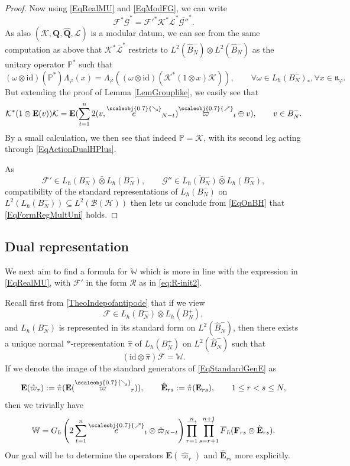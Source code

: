 \documentclass[11pt, reqno]{amsart}
\theoremstyle{definition}
\numberwithin{equation}{section}
\def\Fc{\mathcal F'}
\def\Rc{\mathcal R}
\newcommand{\Hsp}{\mathcal{H}}
\newcommand{\Bc}{\mathcal{B}}
\newcommand{\eb}{\mathbf{E}}
\newcommand{\Gauss}{G}
\newcommand{\Qb}{\mathbf{Q}}
\newcommand{\Kc}{\mathcal{K}}
\newcommand{\Fct}{\mathcal{F}}
\newcommand{\tFct}{\mathcal{G}}
\newcommand{\tFctt}{\mathcal{G}''}
\newcommand{\tKc}{\mathcal L}
\newcommand{\Bor}{B}
\newcommand{\nears}{\scaleobj{0.7}{\nearrow}}
\newcommand{\sears}{\scaleobj{0.7}{\searrow}}
\newcommand{\nee}{\overset{\nears}{e}}
\newcommand{\seee}{\overset{\sears}{e}}
\newcommand{\nevarpi}{\overset{\nears}{\varpi}}
\newcommand{\sevarpi}{\overset{\sears}{\varpi}}
\newcommand{\id}{\mathrm{id}}
\newcommand{\Eb}{\mathbf{E}}
\newcommand{\Wbb}{\mathbb{W}}
\newcommand{\mfn}{\mathfrak{n}}
\newcommand{\Lc}{\mathcal{L}}
\newcommand{\Pbb}{\mathbb{P}}
\def\stgE{\mathbf{E}}
\def\stgF{\mathbf{F}}
\begin{document}
\begin{proof}
Now using \eqref{EqRealMU} and \eqref{EqModFG}, we can write 
\[
\Fct^* \overline{\tFct}^* = \Fc^* \Kc^*\overline{\tKc}^* \overline{\tFctt}^*.
\]
As also $(\Kc,\Qb,\hat{\Qb},\Lc)$ is a modular datum, we can see from the same computation as above that $\Kc^* \overline{\tKc}^*$ restricts to $L^2(\hat{\Bor}_N^-)\otimes L^2(\hat{\Bor}_N^-)$ as the unitary operator $\Pbb^*$ such that 
\[
(\omega\otimes \id)(\Pbb^*)\Lambda_{\varphi}(x) = \Lambda_{\varphi}((\omega\otimes \id)(\Kc^*(1\otimes x)\Kc)),\qquad \forall \omega \in L_{\hbar}(\Bor_N^-)_*,\forall x\in \mfn_{\varphi}. 
\]
But extending the proof of Lemma \ref{LemGrouplike}, we easily see that 
\begin{equation}\label{EqActionK}
\Kc^*(1\otimes \Eb(v))\Kc = \Eb(\sum_{t=1}^n 2(v,\seee_{N-t})\nevarpi_t \oplus v),\qquad v \in \Bor_N^-.
\end{equation}
By a small calculation, we then see that indeed $\Pbb = \Kc$, with its second leg acting through \eqref{EqActionDualHPlus}.

As 
\[
\Fc \in L_{\hbar}(B_N^-) \bar{\otimes} L_{\hbar}(B_N^-), \qquad \tFctt \in \overline{L_{\hbar}(B_N^-)}\bar{\otimes} L_{\hbar}(B_N^-), 
\]
compatibility of the standard representations of $L_{\hbar}(B_N^-)$ on $L^2(L_{\hbar}(B_N^-))\subseteq L^2(\Bc(\Hsp))$ then lets us conclude from \eqref{EqOnBH} that \eqref{EqFormRegMultUni} holds.
\end{proof}

\subsection{Dual representation} \label{subsection:dual}
We next aim to find a formula for $\Wbb$ which is more in line with the expression in \eqref{EqRealMU}, with $\Fc$ in the form  $\Rc$ as in \eqref{eq:R-init2}. 

Recall first from 
\eqref{TheoIndepofantipode} that if we view 
\[
\Fct \in L_{\hbar}(\Bor_N^-) \bar{\otimes}L_{\hbar}(\Bor_N^+), 
\]
and $L_{\hbar}(\Bor_N^-)$ is represented in its standard form on $L^2(\hat{\Bor}_N^-)$, then there exists a unique normal $*$-representation $\hat{\pi}$ of $L_{\hbar}(\Bor_N^+)$ on $L^2(\hat{\Bor}_N^-)$ such that 
\[
(\id\otimes \hat{\pi})\Fct = \Wbb. 
\]
If we denote the image of the standard generators of \eqref{EqStandardGenE} as 
\[
\eb(\hat{\varpi}_r) := \hat{\pi}(\eb(\sevarpi_r)),\qquad \hat{\stgE}_{rs} := \hat{\pi}(\stgE_{rs}),\qquad 1\leq r<s\leq N,
\]
then we trivially have 
\[
\Wbb =   \Gauss_\hbar\left(2 \sum_{t=1}^n \nee_{t} \otimes \hat{\varpi}_{N - t}\right) \prod_{r=1}^{\substack{n \\[-2pt] \longrightarrow}} \prod_{s=r+1}^{\substack{n+1 \\[-2pt] \longrightarrow}} \overline{F}_\hbar(\stgF_{rs} \otimes \hat{\stgE}_{rs}).
\]
Our goal will be to determine the operators $\eb(\hat{\varpi}_r)$ and $\hat{\stgE}_{rs}$ more explicitly. 
\end{document}
